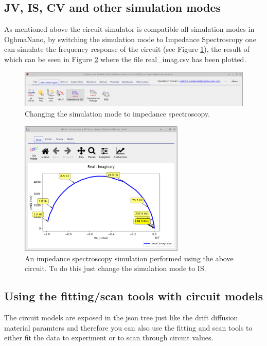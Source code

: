 \subsection{JV, IS, CV and other simulation modes}
As mentioned above the circuit simulator is compatible all simulation modes in OghmaNano, by switching the simulation mode to Impedance Spectroscopy one can simulate the frequency response of the circuit (see Figure \ref{fig:simulation_modes}), the result of which can be seen in Figure \ref{fig:circuit_real_imag} where the file real\_imag.csv has been plotted.
 
\begin{figure}[H]
\centering
\includegraphics[width=1.0\textwidth,height=0.17\textwidth]{./images/circuit/simulation_modes.png}
\caption{Changing the simulation mode to impedance spectroscopy.}
\label{fig:simulation_modes}
\end{figure}

\begin{figure}[H]
\centering
\includegraphics[width=0.7\textwidth,height=0.6\textwidth]{./images/circuit/real_imag.png}
\caption{An impedance spectroscopy simulation performed using the above circuit. To do this just change the simulation mode to IS.}
\label{fig:circuit_real_imag}
\end{figure}

\subsection{Using the fitting/scan tools with circuit models}
The circuit models are exposed in the json tree just like the drift diffusion material paramters and therefore you can also use the fitting and scan tools to either fit the data to experiment or to scan through circuit values.


